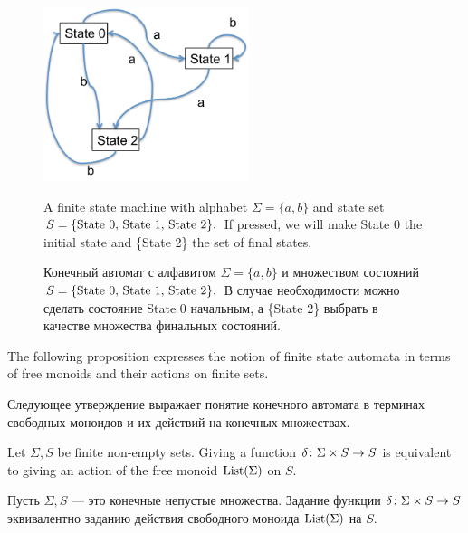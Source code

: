 \documentclass[../main/CT4S-EN-RU]{subfiles}
\begin{document}
\begin{figure}[h]
\begin{center}
\includegraphics[height=2in]{FSM1}
\end{center}
\begin{blockENG}
\caption{A finite state machine with alphabet $\Sigma=\{a,b\}$ and state set $S=\{\textnormal{State 0, State 1, State 2}\}.$ If pressed, we will make State 0 the initial state and \{State 2\} the set of final states.}\label{fig:fsa}
\end{blockENG}
\begin{blockRUS}
\caption{Конечный автомат с алфавитом $\Sigma=\{a,b\}$ и множеством состояний $S=\{\textnormal{State 0, State 1, State 2}\}.$ В случае необходимости можно сделать состояние State 0 начальным, а \{State 2\} выбрать в качестве множества финальных состояний.}\label{fig:fsa}
\end{blockRUS}
\end{figure}

\begin{blockENG}
The following proposition expresses the notion of finite state automata in terms of free monoids and their actions on finite sets.
\end{blockENG}

\begin{blockRUS}
Следующее утверждение выражает понятие конечного автомата в терминах свободных моноидов и их действий на конечных множествах.
\end{blockRUS}

\begin{propositionENG}
Let $\Sigma, S$ be finite non-empty sets. Giving a function $\delta\colon\Sigma\times S\rightarrow S$ is equivalent to giving an action of the free monoid $\operatorname{List}(\Sigma)$ on $S.$
\end{propositionENG}

\begin{propositionRUS}
Пусть $\Sigma, S$ — это конечные непустые множества. Задание функции $\delta\colon\Sigma\times S\rightarrow S$ эквивалентно заданию действия свободного моноида $\operatorname{List}(\Sigma)$ на $S.$
\end{propositionRUS}
\end{document}

